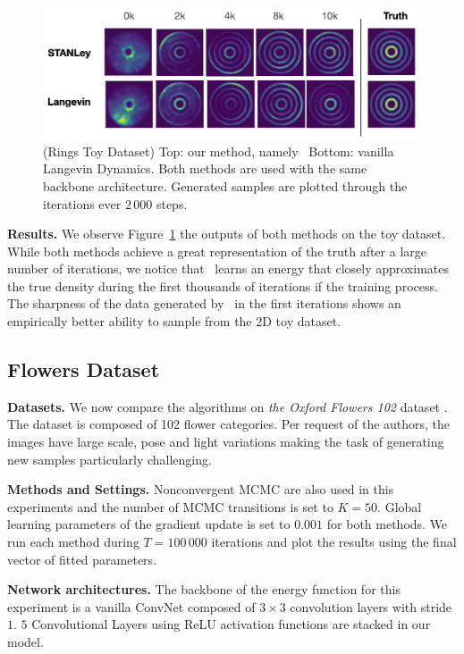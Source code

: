 \documentclass[10pt,twocolumn,letterpaper]{article}
\begin{document}
\begin{figure}[H]
\begin{center}
\includegraphics[width=1.\linewidth]{figs/rings}
\end{center}
   \caption{(Rings Toy Dataset) Top: our method, namely \algo\ Bottom: vanilla Langevin Dynamics. Both methods are used with the same backbone architecture. Generated samples are plotted through the iterations ever $2\,000$ steps.}
\label{fig:resultstoy}
\end{figure}

\medskip
\textbf{Results.} 
We observe Figure~\ref{fig:resultstoy} the outputs of both methods on the toy dataset.
While both methods achieve a great representation of the truth after a large number of iterations, we notice that \algo\ learns an energy that closely approximates the true density during the first thousands of iterations if the training process.
The sharpness of the data generated by \algo\ in the first iterations shows an empirically better ability to sample from the 2D toy dataset.

\subsection{Flowers Dataset}

\textbf{Datasets.}
We now compare the algorithms on \emph{the Oxford Flowers 102} dataset \cite{nilsback2008automated}.
The dataset is composed of 102 flower categories.
Per request of the authors, the images have large scale, pose and light variations making the task of generating new samples particularly challenging.

\medskip
\textbf{Methods and Settings.}
Nonconvergent MCMC are also used in this experiments and the number of MCMC transitions is set to $K = 50$.
Global learning parameters of the gradient update is set to $0.001$ for both methods.
We run each method during $T = 100\,000$ iterations and plot the results using the final vector of fitted parameters.


\medskip
\textbf{Network architectures.} 
The backbone of the energy function for this experiment is a vanilla ConvNet composed of $3 \times 3$ convolution layers with stride $1$.
$5$ Convolutional Layers using ReLU activation functions are stacked in our model.
\end{document}
